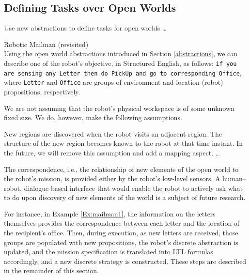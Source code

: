 \subsection{Defining Tasks over Open Worlds}

Use new abstractions to define tasks for open worlds \ldots

\begin{myExample}\label{Ex:mailman2} Robotic Mailman (revisited)\\
	Using the open world abstractions introduced in Section \ref{abstractions}, we can describe one of the robot's objective, in Structured English, as follows: 
\texttt{if you are sensing any Letter then do PickUp and go to corresponding Office}, where \texttt{Letter} and \texttt{Office} are groups of environment and location (robot) propositions, respectively.
\end{myExample}

We are not assuming that the robot's physical workspace is of some unknown fixed size. We do, however, make the following assumptions.

\begin{myAssumption}
	New regions are discovered when the robot visits an adjacent region. The structure of the new region becomes known to the robot at that time instant. In the future, we will remove this assumption and add a mapping aspect. \ldots
\end{myAssumption}

\begin{myAssumption}
	The correspondence, i,e., the relationship of new elements of the open world to the robot's mission, is provided either by the robot's low-level sensors. A human--robot, dialogue-based interface that would enable the robot to actively ask what to do upon discovery of new elements of the world is a subject of future research.
\end{myAssumption}

For instance, in Example \ref{Ex:mailman1}, the information on the letters themselves provides the correspondence between each letter and the location of the recipient's office. Then, during execution, as new letters are received, those groups are populated with new propositions, the robot's discrete abstraction is updated, and the mission specification is translated into LTL formulas accordingly, and a new discrete strategy is constructed. These steps are described in the remainder of this section.

